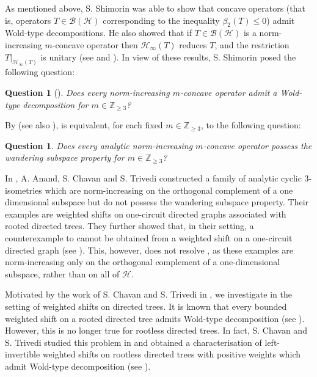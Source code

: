 \documentclass[11pt, reqno, a4paper]{amsart}
\newtheorem{question}[theorem]{Question}
\theoremstyle{definition}
\newcommand{\calB}{{\mathcal{B}}}
\newcommand{\calH}{{\mathcal{H}}}
\renewcommand{\le}{\leqslant}
\renewcommand{\ge}{\geqslant}
\newcommand{\Z}{\mathbb Z}
\numberwithin{equation}{section}
\begin{document}
    As mentioned above, S. Shimorin was able to show that concave operators (that is, operators $T \in\calB (\calH)$ corresponding to the inequality $\beta_2 (T) \le 0$) admit Wold-type decompositions. He also showed that if $T\in\calB(\calH)$ is a norm-increasing $m$-concave operator then $\calH_\infty(T)$ reduces $T$, and the restriction $T|_{\calH_\infty(T)}$ is unitary (see  and \cite[Proposition 3.4]{zbMATH01572594}). In view of these results, S. Shimorin posed the following question:

    \begin{question}[{\cite[p. 185]{zbMATH01572594}}]
        Does every norm-increasing $m$-concave operator admit a Wold-type decomposition for $m\in \Z_{\ge 3}$?
        \label{qn:Shimorin}
    \end{question}

    By \cite[Proposition~3.4]{zbMATH01572594} (see also ),  is equivalent, for each fixed $m\in\Z_{\ge 3}$, to the following question:

    \begin{question}
        Does every analytic norm-increasing $m$-concave operator possess the wandering subspace property for $m\in \Z_{\ge 3}$?
        \label{qn:Shimorin-analytic-version}
    \end{question}
    

    In \cite[Example 3.1]{MR4078097}, A. Anand, S. Chavan and S. Trivedi constructed a family of analytic cyclic $3$-isometries which are norm-increasing on the orthogonal complement of a one dimensional subspace but do not possess the wandering subspace property. Their examples are weighted shifts on one-circuit directed graphs associated with rooted directed trees. They further showed that, in their setting, a counterexample to  cannot be obtained from a weighted shift on a one-circuit directed graph (see \cite[Corollary~4.4]{MR4078097}). This, however, does not resolve , as these examples are norm-increasing only on the orthogonal complement of a one-dimensional subspace, rather than on all of $\calH$.

    Motivated by the work of S. Chavan and S. Trivedi in \cite{MR5052237}, we investigate  in the setting of weighted shifts on directed trees. It is known that every bounded weighted shift on a rooted directed tree admits Wold-type decomposition (see \cite[Proposition 1.3.4]{MR3740250}). However, this is no longer true for rootless directed trees. In fact, S. Chavan and S. Trivedi studied this problem in \cite{MR5052237} and obtained a characterisation of left-invertible weighted shifts on rootless directed trees with positive weights which admit Wold-type decomposition (see \cite[Theorem 1.3]{MR5052237}).
\end{document}
